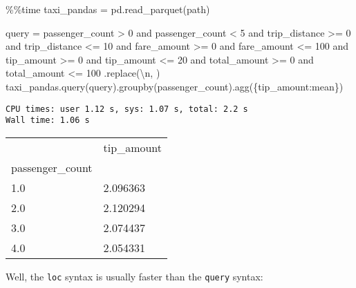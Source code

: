 \documentclass[
  letterpaper,
  DIV=11,
  numbers=noendperiod]{scrartcl}
\newenvironment{Shaded}{\begin{snugshade}}{\end{snugshade}}
\newcommand{\CharTok}[1]{\textcolor[rgb]{0.13,0.47,0.30}{#1}}
\newcommand{\NormalTok}[1]{\textcolor[rgb]{0.00,0.23,0.31}{#1}}
\newcommand{\OperatorTok}[1]{\textcolor[rgb]{0.37,0.37,0.37}{#1}}
\newcommand{\StringTok}[1]{\textcolor[rgb]{0.13,0.47,0.30}{#1}}
\begin{document}
\begin{Shaded}
\begin{Highlighting}[]
\OperatorTok{\%\%}\NormalTok{time }
\NormalTok{taxi\_pandas }\OperatorTok{=}\NormalTok{ pd.read\_parquet(path)}

\NormalTok{query }\OperatorTok{=} \StringTok{\textquotesingle{}\textquotesingle{}\textquotesingle{}}
\StringTok{    passenger\_count \textgreater{} 0 and }
\StringTok{    passenger\_count \textless{} 5 and  }
\StringTok{    trip\_distance \textgreater{}= 0 and }
\StringTok{    trip\_distance \textless{}= 10 and }
\StringTok{    fare\_amount \textgreater{}= 0 and }
\StringTok{    fare\_amount \textless{}= 100 and }
\StringTok{    tip\_amount \textgreater{}= 0 and }
\StringTok{    tip\_amount \textless{}= 20 and }
\StringTok{    total\_amount \textgreater{}= 0 and }
\StringTok{    total\_amount \textless{}= 100}
\StringTok{    \textquotesingle{}\textquotesingle{}\textquotesingle{}}\NormalTok{.replace(}\StringTok{\textquotesingle{}}\CharTok{\textbackslash{}n}\StringTok{\textquotesingle{}}\NormalTok{, }\StringTok{\textquotesingle{}\textquotesingle{}}\NormalTok{)}
\NormalTok{taxi\_pandas.query(query).groupby(}\StringTok{\textquotesingle{}passenger\_count\textquotesingle{}}\NormalTok{).agg(\{}\StringTok{\textquotesingle{}tip\_amount\textquotesingle{}}\NormalTok{:}\StringTok{\textquotesingle{}mean\textquotesingle{}}\NormalTok{\})}
\end{Highlighting}
\end{Shaded}

\begin{verbatim}
CPU times: user 1.12 s, sys: 1.07 s, total: 2.2 s
Wall time: 1.06 s
\end{verbatim}

\begin{longtable}[]{@{}ll@{}}
\toprule()
& tip\_amount \\
passenger\_count & \\
\midrule()
\endhead
1.0 & 2.096363 \\
2.0 & 2.120294 \\
3.0 & 2.074437 \\
4.0 & 2.054331 \\
\bottomrule()
\end{longtable}

Well, the \texttt{loc} syntax is usually faster than the \texttt{query}
syntax:
\end{document}

